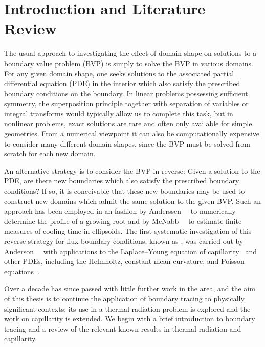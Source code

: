 \chapter{Introduction and Literature Review}
\label{ch:introduction}

The usual approach
to investigating the effect of domain shape
on solutions to a boundary value problem (BVP)
is simply to solve the BVP in various domains.
For any given domain shape, one seeks solutions
to the associated partial differential equation (PDE) in the interior
which also satisfy the prescribed boundary conditions on the boundary.
In linear problems possessing sufficient symmetry,
the superposition principle
together with separation of variables or integral transforms
would typically allow us to complete this task,
but in nonlinear problems,
exact solutions are rare and often only available for simple geometries.
From a numerical viewpoint
it can also be computationally expensive
to consider many different domain shapes,
since the BVP must be solved from scratch for each new domain.

An alternative strategy is to
consider the BVP in reverse:
Given a solution to the PDE\@, are there new boundaries
which also satisfy the prescribed boundary conditions?
If so, it is conceivable that these new boundaries may be used
to construct new domains
which admit the same solution to the given BVP\@.
Such an approach has been employed in an \adhoc{} fashion
by Anderssen~\etal~\cite{anderssen-1969-ion-uptake-growing-roots}
to numerically determine the profile of a growing root
and by McNabb~\etal~\cite{mcnabb-1991-theoretical-derivation-freezing-times}
to estimate finite measures of cooling time in ellipsoids.
The first systematic investigation of this
reverse strategy for flux boundary conditions,
known as ,
was carried out by
Anderson~\etal~\cite{anderson-2007-boundary-tracing-i-theory}
with applications to the Laplace--Young equation
of capillarity~\cite{anderson-2006-exact-solutions-laplace-young}
and other PDEs, including the Helmholtz,
constant mean curvature, and
Poisson equations~\cite{anderson-2007-boundary-tracing-ii-applications}.

Over a decade has since passed
with little further work in the area,
and the aim of this thesis is to
continue the application of boundary tracing
to physically significant contexts;
its use in a thermal radiation problem is explored
and the work on capillarity is extended.
We begin with a brief introduction to boundary tracing
and a review of the relevant known results
in thermal radiation and capillarity.

